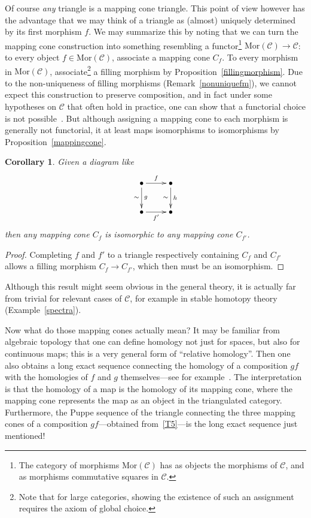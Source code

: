 \documentclass{amsproc}
\newtheorem{cor}[prop]{Corollary}
\theoremstyle{definition}
\begin{document}
Of course \emph{any} triangle is a mapping cone triangle. This point of view however has the advantage that we may think of a triangle as (almost) uniquely determined by its first morphism $f$. We may summarize this by noting that we can turn the mapping cone construction into something resembling a functor\footnote{The category of morphisms ${\mathrm{Mor}}({\mathcal{C}})$ has as objects the morphisms of ${\mathcal{C}}$, and as morphisms commutative squares in ${\mathcal{C}}$.} ${\mathrm{Mor}}({\mathcal{C}}){\longrightarrow}{\mathcal{C}}$: to every object $f\in{\mathrm{Mor}}({\mathcal{C}})$, associate a mapping cone $C_f$. To every morphism in ${\mathrm{Mor}}({\mathcal{C}})$, associate\footnote{Note that for large categories, showing the existence of such an assignment requires the axiom of global choice.} a filling morphism by Proposition~\ref{fillingmorphism}. Due to the non-uniqueness of filling morphisms (Remark~\ref{nonuniquefm}), we cannot expect this construction to preserve composition, and in fact under some hypotheses on ${\mathcal{C}}$ that often hold in practice, one can show that a functorial choice is not possible~\cite{Stev}. But although assigning a mapping cone to each morphism is generally not functorial, it at least maps isomorphisms to isomorphisms by Proposition~\ref{mappingcone}.

\begin{cor}
\label{mapconeiso}
Given a diagram like
\begin{displaymath}
\xymatrix{{}\bullet\ar[r]^f\ar[d]^g_\sim & {}\bullet\ar[d]^h_\sim\\
{}\bullet\ar[r]_{f'} & {}\bullet}
\end{displaymath}
then any mapping cone $C_f$ is isomorphic to any mapping cone $C_{f'}$.
\end{cor}

\begin{proof}
Completing $f$ and $f'$ to a triangle respectively containing $C_f$ and $C_{f'}$ allows a filling morphism $C_f{\longrightarrow} C_{f'}$, which then must be an isomorphism.
\end{proof}

Although this result might seem obvious in the general theory, it is actually far from trivial for relevant cases of ${\mathcal{C}}$, for example in stable homotopy theory (Example~\ref{spectra}).

Now what do those mapping cones actually mean? It may be familiar from algebraic topology that one can define homology not just for spaces, but also for continuous maps; this is a very general form of ``relative homology''. Then one also obtains a long exact sequence connecting the homology of a composition $gf$ with the homologies of $f$ and $g$ themselves---see for example~\cite{BottTu}. The interpretation is that the homology of a map is the homology of its mapping cone, where the mapping cone represents the map as an object in the triangulated category. Furthermore, the Puppe sequence of the triangle connecting the three mapping cones of a composition $gf$---obtained from~\ref{T5}---is the long exact sequence just mentioned! 
\end{document}
